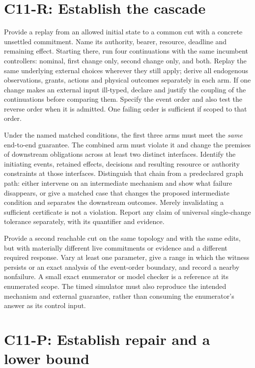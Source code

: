 \documentclass[11pt]{article}
\begin{document}
\section{C11-R: Establish the cascade}

Provide a replay from an allowed initial state to a common cut with a concrete unsettled commitment. Name its authority, bearer, resource, deadline and remaining effect. Starting there, run four continuations with the same incumbent controllers: nominal, first change only, second change only, and both. Replay the same underlying external choices wherever they still apply; derive all endogenous observations, grants, actions and physical outcomes separately in each arm. If one change makes an external input ill-typed, declare and justify the coupling of the continuations before comparing them. Specify the event order and also test the reverse order when it is admitted. One failing order is sufficient if scoped to that order.

Under the named matched conditions, the first three arms must meet the \emph{same} end-to-end guarantee. The combined arm must violate it and change the premises of downstream obligations across at least two distinct interfaces. Identify the initiating events, retained effects, decisions and resulting resource or authority constraints at those interfaces. Distinguish that chain from a predeclared graph path: either intervene on an intermediate mechanism and show what failure disappears, or give a matched case that changes the proposed intermediate condition and separates the downstream outcomes. Merely invalidating a sufficient certificate is not a violation. Report any claim of universal single-change tolerance separately, with its quantifier and evidence.

Provide a second reachable cut on the same topology and with the same edits, but with materially different live commitments or evidence and a different required response. Vary at least one parameter, give a range in which the witness persists or an exact analysis of the event-order boundary, and record a nearby nonfailure. A small exact enumerator or model checker is a reference at its enumerated scope. The timed simulator must also reproduce the intended mechanism and external guarantee, rather than consuming the enumerator's answer as its control input.

\section{C11-P: Establish repair and a lower bound}
\end{document}
